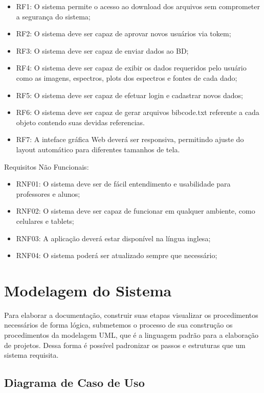 \begin{itemize}
\item RF1: O sistema permite o acesso ao download dos arquivos sem comprometer a segurança do sistema;
\item RF2: O sistema deve ser capaz de aprovar novos usuários via tokem;
\item RF3: O sistema deve ser capaz de enviar dados ao BD;
\item RF4: O sistema deve ser capaz de exibir os dados requeridos pelo usuário como as imagens, espectros, plots dos espectros e fontes de cada dado;
\item RF5: O sistema deve ser capaz de efetuar login e cadastrar novos dados;
\item RF6: O sistema deve ser capaz de gerar arquivos bibcode.txt referente a cada objeto contendo suas devidas referencias.
\item RF7: A inteface gráfica Web deverá ser responsiva, permitindo ajuste do layout automático para diferentes tamanhos de tela.
\end{itemize}

Requisitos Não Funcionais:

\begin{itemize}
\item RNF01: O sistema deve ser de fácil entendimento e usabilidade para professores e alunos;
\item RNF02: O sistema deve ser capaz de funcionar em qualquer ambiente, como celulares e tablets;
\item RNF03: A aplicação deverá estar disponível na língua inglesa;
\item RNF04: O sistema poderá ser atualizado sempre que necessário;
\end{itemize}

\section{Modelagem do Sistema}

Para elaborar a documentação, construir suas etapas visualizar os procedimentos necessários de forma lógica, submetemos o processo de sua construção os procedimentos da modelagem UML, que é a linguagem padrão para a elaboração de projetos. Dessa forma é possível padronizar os passos e estruturas que um sistema requisita. 

\subsection{Diagrama de Caso de Uso}

